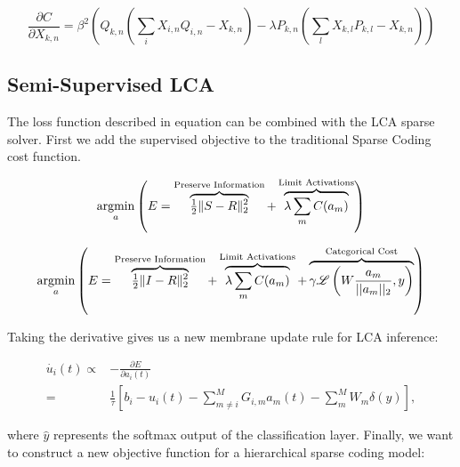 \begin{equation} \label{costgrad}
    \frac{\partial C}{\partial X_{k,n}} = \beta^{2} \left( Q_{k,n} \left(\sum_{i}X_{i,n}Q_{i,n} - X_{k,n}\right) - \lambda P_{k,n} \left( \sum_{l}X_{k,l}P_{k,l} - X_{k,n}\right)\right)
\end{equation}

\subsection{Semi-Supervised LCA}
\noindent The loss function described in equation \label{costgrad} can be combined with the LCA sparse solver. First we add the supervised objective to the traditional Sparse Coding cost function.

\begin{equation} \label{sparse_coding_energy}
    \argmin\limits_{a}
        \left( E =
            \overbrace{ \tfrac{1}{2} \| S - R \|_{2}^{2} }^\text{Preserve Information} +
        \overbrace{ \lambda \sum\limits_{m}C(a_{m}) }^\text{Limit Activations} \right)
\end{equation}

\begin{equation} \label{semi_supervised_energy}
    \argmin\limits_{a}
        \left( E =
            \overbrace{ \tfrac{1}{2} \| I - R \|_{2}^{2} }^\text{Preserve Information} +
        \overbrace{ \lambda \sum\limits_{m}C(a_{m}) }^\text{Limit Activations}  +
        \overbrace{ \gamma \mathscr{L} \left(W \frac{a_{m}}{||a_{m}||_{2}}, y\right) }^\text{Categorical Cost}
        \right)
\end{equation}

\noindent Taking the derivative gives us a new membrane update rule for LCA inference:

\begin{equation} \label{lcaupdate}
\begin{aligned}
    \dot{u_{i}}(t) \propto
    &-\frac{\partial E}{\partial a_{i}(t)} \\
    = &\frac{1}{\tau} \left[ b_{i} - u_{i}(t) - \sum_{m \neq i}^{M}G_{i,m}a_{m}(t) - \sum_{m}^{M} W_{m} \delta\left(\hat{y}\right)\right],
\end{aligned}
\end{equation}

\noindent where $\hat{y}$ represents the softmax output of the classification layer. Finally, we want to construct a new objective function for a hierarchical sparse coding model:

